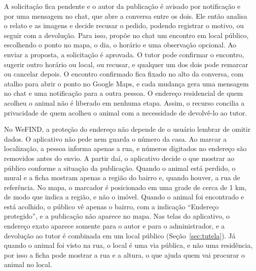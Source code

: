 A solicitação fica pendente e o autor da publicação é avisado por notificação e por uma mensagem no chat, que abre a conversa entre os dois. Ele então analisa o relato e as imagens e decide recusar o pedido, podendo registrar o motivo, ou seguir com a devolução. Para isso, propõe no chat um encontro em local público, escolhendo o ponto no mapa, o dia, o horário e uma observação opcional. Ao enviar a proposta, a solicitação é aprovada. O tutor pode confirmar o encontro, sugerir outro horário ou local, ou recusar, e qualquer um dos dois pode remarcar ou cancelar depois. O encontro confirmado fica fixado no alto da conversa, com atalho para abrir o ponto no Google Maps, e cada mudança gera uma mensagem no chat e uma notificação para a outra pessoa. O endereço residencial de quem acolheu o animal não é liberado em nenhuma etapa. Assim, o recurso concilia a privacidade de quem acolheu o animal com a necessidade de devolvê-lo ao tutor.

No WeFIND, a proteção do endereço não depende de o usuário lembrar de omitir dados. O aplicativo não pede nem guarda o número da casa. Ao marcar a localização, a pessoa informa apenas a rua, e números digitados no endereço são removidos antes do envio. A partir daí, o aplicativo decide o que mostrar ao público conforme a situação da publicação. Quando o animal está perdido, o mural e a ficha mostram apenas a região do bairro e, quando houver, a rua de referência. No mapa, o marcador é posicionado em uma grade de cerca de 1 km, de modo que indica a região, e não o imóvel. Quando o animal foi encontrado e está acolhido, o público vê apenas o bairro, com a indicação ``Endereço protegido'', e a publicação não aparece no mapa. Nas telas do aplicativo, o endereço exato aparece somente para o autor e para o administrador, e a devolução ao tutor é combinada em um local público (Seção~\ref{sec:tutela}). Já quando o animal foi visto na rua, o local é uma via pública, e não uma residência, por isso a ficha pode mostrar a rua e a altura, o que ajuda quem vai procurar o animal no local.

